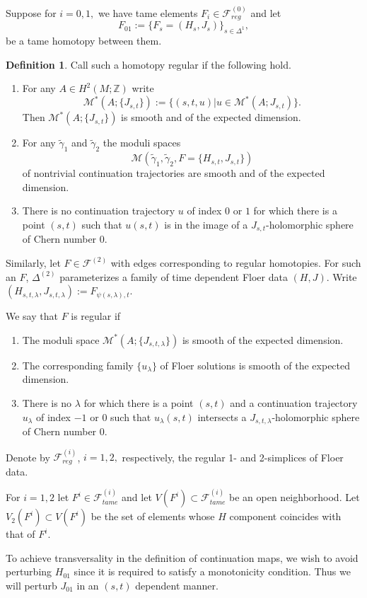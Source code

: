 \documentclass[11pt]{amsart}
\newcommand{\Z}{\mathbb{Z}}
\theoremstyle{definition}
\newtheorem{df}[tm]{Definition}
\theoremstyle{remark}
\begin{document}
Suppose for $i=0,1,$ we have tame elements $F_i\in\mathcal{F}^{(0)}_{reg}$ and let
\[
    F_{01}:=\{F_s=(H_s,J_s)\}_{s\in\Delta^1},
\]
be a tame homotopy between them.
\begin{df}\label{horeg}
Call such a homotopy regular if the following hold.
\begin{enumerate}
    \item For any $A\in H^2(M;\Z)$ write
    \[
    \mathcal{M}^*(A;\{J_{s,t}\}):=\{(s,t,u)|u\in\mathcal{M}^*(A;J_{s,t})\}.
    \]
   Then $\mathcal{M}^*(A;\{J_{s,t}\})$ is smooth and of the expected dimension.
   \item For any $\tilde{\gamma}_1$ and $\tilde{\gamma}_2$ the moduli spaces
    \[
    \mathcal{M}(\tilde{\gamma}_1,\tilde{\gamma}_2,F=\{H_{s,t},J_{s,t}\})
    \]
of nontrivial continuation trajectories are smooth and of the expected dimension.
    \item There is no continuation trajectory $u$ of index $0$ or $1$ for which there is a point $(s,t)$ such that $u(s,t)$ is in the image of a $J_{s,t}$-holomorphic sphere of Chern number $0$.
\end{enumerate}
Similarly, let $F\in\mathcal{F}^{(2)}$ with edges corresponding to regular homotopies. For such an $F$, $\Delta^{(2)}$ parameterizes a family of time dependent Floer data $(H,J)$. Write $(H_{s,t,\lambda},J_{s,t,\lambda}):=F_{\psi(s,\lambda),t}$.

We say that $F$ is regular if
\begin{enumerate}
\item The moduli space  $\mathcal{M}^*(A;\{J_{s,t,\lambda}\})$ is smooth of the expected dimension.
\item The corresponding family $\{u_\lambda\}$ of Floer solutions is smooth of the expected dimension.
\item There is no $\lambda$ for which there is a point $(s,t )$ and a continuation trajectory $u_\lambda$ of index $-1$ or $0$ such that $u_{\lambda}(s,t)$ intersects a $J_{s,t,\lambda}$-holomorphic sphere of Chern number $0$.
\end{enumerate}
Denote by $\mathcal{F}^{(i)}_{reg}$, $i=1,2,$ respectively, the regular 1- and 2-simplices of Floer data.
\end{df}
For $i=1,2$ let $F^i\in\mathcal{F}^{(i)}_{tame}$ and let $V(F^i)\subset\mathcal{F}^{(i)}_{tame}$ be an open neighborhood. Let $V_2(F^i)\subset V(F^i)$ be the set of elements whose $H$ component coincides with that of $F^i$.

To achieve transversality in the definition of continuation maps, we wish to avoid perturbing $H_{01}$ since it is required to satisfy a monotonicity condition. Thus we will perturb $J_{01}$ in an $(s,t)$ dependent manner.
\end{document}
